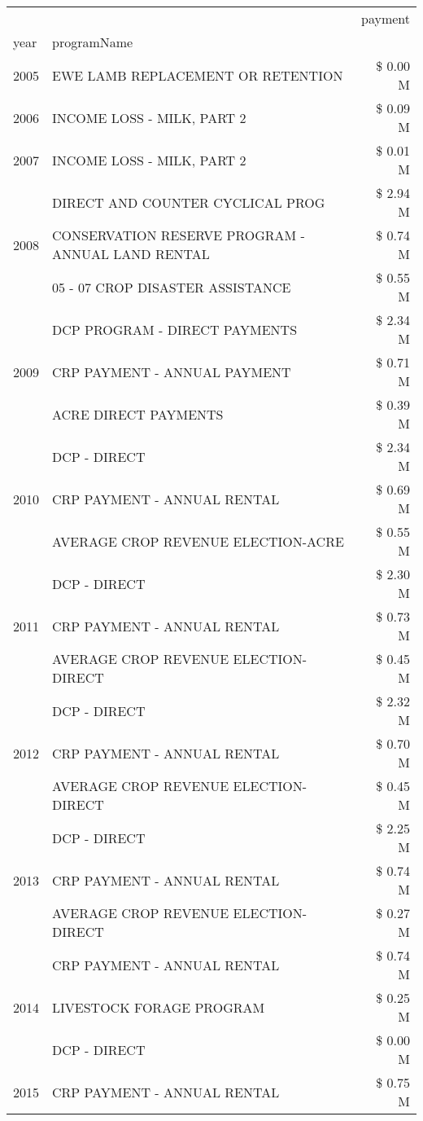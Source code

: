 \begin{tabular}{llr}
\toprule
 &  & payment \\
year & programName &  \\
\midrule
2005 & EWE LAMB REPLACEMENT OR RETENTION & \$ 0.00 M \\
\cline{1-3}
2006 & INCOME LOSS - MILK, PART 2 & \$ 0.09 M \\
\cline{1-3}
2007 & INCOME LOSS - MILK, PART 2 & \$ 0.01 M \\
\cline{1-3}
\multirow[t]{3}{*}{2008} & DIRECT AND COUNTER CYCLICAL PROG & \$ 2.94 M \\
 & CONSERVATION RESERVE PROGRAM - ANNUAL LAND RENTAL & \$ 0.74 M \\
 & 05 - 07 CROP DISASTER ASSISTANCE & \$ 0.55 M \\
\cline{1-3}
\multirow[t]{3}{*}{2009} & DCP PROGRAM - DIRECT PAYMENTS & \$ 2.34 M \\
 & CRP PAYMENT - ANNUAL PAYMENT & \$ 0.71 M \\
 & ACRE DIRECT PAYMENTS & \$ 0.39 M \\
\cline{1-3}
\multirow[t]{3}{*}{2010} & DCP - DIRECT & \$ 2.34 M \\
 & CRP PAYMENT - ANNUAL RENTAL & \$ 0.69 M \\
 & AVERAGE CROP REVENUE ELECTION-ACRE & \$ 0.55 M \\
\cline{1-3}
\multirow[t]{3}{*}{2011} & DCP - DIRECT & \$ 2.30 M \\
 & CRP PAYMENT - ANNUAL RENTAL & \$ 0.73 M \\
 & AVERAGE CROP REVENUE ELECTION-DIRECT & \$ 0.45 M \\
\cline{1-3}
\multirow[t]{3}{*}{2012} & DCP - DIRECT & \$ 2.32 M \\
 & CRP PAYMENT - ANNUAL RENTAL & \$ 0.70 M \\
 & AVERAGE CROP REVENUE ELECTION-DIRECT & \$ 0.45 M \\
\cline{1-3}
\multirow[t]{3}{*}{2013} & DCP - DIRECT & \$ 2.25 M \\
 & CRP PAYMENT - ANNUAL RENTAL & \$ 0.74 M \\
 & AVERAGE CROP REVENUE ELECTION-DIRECT & \$ 0.27 M \\
\cline{1-3}
\multirow[t]{3}{*}{2014} & CRP PAYMENT - ANNUAL RENTAL & \$ 0.74 M \\
 & LIVESTOCK FORAGE PROGRAM & \$ 0.25 M \\
 & DCP - DIRECT & \$ 0.00 M \\
\cline{1-3}
\multirow[t]{3}{*}{2015} & CRP PAYMENT - ANNUAL RENTAL & \$ 0.75 M \\

\end{tabular}
